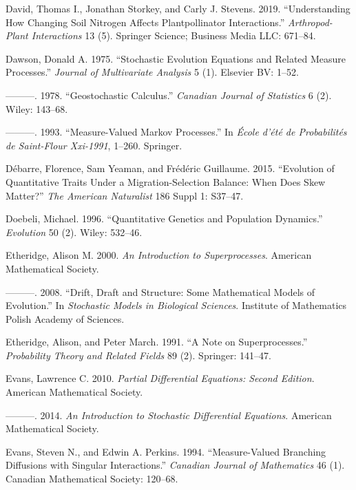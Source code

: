 \documentclass[]{article}
\begin{document}
\leavevmode\hypertarget{ref-David2019}{}%
David, Thomas I., Jonathan Storkey, and Carly J. Stevens. 2019.
``Understanding How Changing Soil Nitrogen Affects Plantpollinator
Interactions.'' \emph{Arthropod-Plant Interactions} 13 (5). Springer
Science; Business Media LLC: 671--84.

\leavevmode\hypertarget{ref-Dawson1975}{}%
Dawson, Donald A. 1975. ``Stochastic Evolution Equations and Related
Measure Processes.'' \emph{Journal of Multivariate Analysis} 5 (1).
Elsevier BV: 1--52.

\leavevmode\hypertarget{ref-Dawson1978}{}%
---------. 1978. ``Geostochastic Calculus.'' \emph{Canadian Journal of
Statistics} 6 (2). Wiley: 143--68.

\leavevmode\hypertarget{ref-dawson1993measure}{}%
---------. 1993. ``Measure-Valued Markov Processes.'' In \emph{École
d'été de Probabilités de Saint-Flour Xxi-1991}, 1--260. Springer.

\leavevmode\hypertarget{ref-Dbarre2015EvolutionOQ}{}%
Débarre, Florence, Sam Yeaman, and Frédéric Guillaume. 2015. ``Evolution
of Quantitative Traits Under a Migration-Selection Balance: When Does
Skew Matter?'' \emph{The American Naturalist} 186 Suppl 1: S37--47.

\leavevmode\hypertarget{ref-Doebeli1996}{}%
Doebeli, Michael. 1996. ``Quantitative Genetics and Population
Dynamics.'' \emph{Evolution} 50 (2). Wiley: 532--46.

\leavevmode\hypertarget{ref-alisonetheridge2000}{}%
Etheridge, Alison M. 2000. \emph{An Introduction to Superprocesses}.
American Mathematical Society.

\leavevmode\hypertarget{ref-Etheridge2008}{}%
---------. 2008. ``Drift, Draft and Structure: Some Mathematical Models
of Evolution.'' In \emph{Stochastic Models in Biological Sciences}.
Institute of Mathematics Polish Academy of Sciences.

\leavevmode\hypertarget{ref-Etheridge1991}{}%
Etheridge, Alison, and Peter March. 1991. ``A Note on Superprocesses.''
\emph{Probability Theory and Related Fields} 89 (2). Springer: 141--47.

\leavevmode\hypertarget{ref-lawrenceevans2010}{}%
Evans, Lawrence C. 2010. \emph{Partial Differential Equations: Second
Edition}. American Mathematical Society.

\leavevmode\hypertarget{ref-9781470410544}{}%
---------. 2014. \emph{An Introduction to Stochastic Differential
Equations}. American Mathematical Society.

\leavevmode\hypertarget{ref-Evans1994}{}%
Evans, Steven N., and Edwin A. Perkins. 1994. ``Measure-Valued Branching
Diffusions with Singular Interactions.'' \emph{Canadian Journal of
Mathematics} 46 (1). Canadian Mathematical Society: 120--68.
\end{document}
